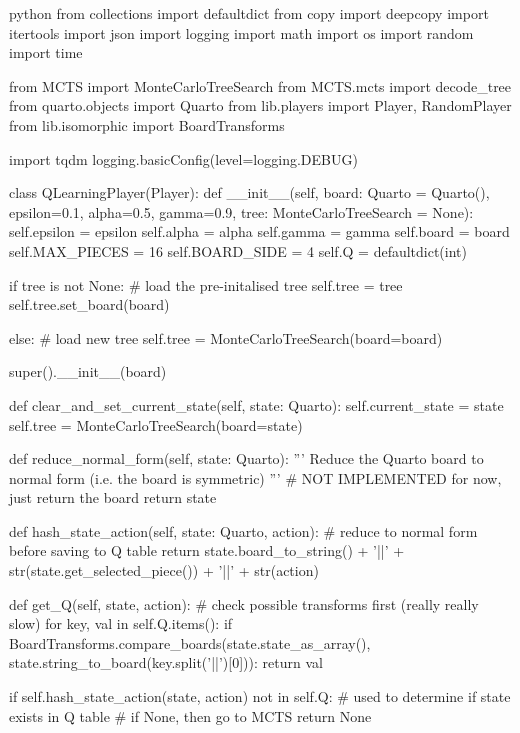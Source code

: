 \begin{mintedbox}{python}
from collections import defaultdict
from copy import deepcopy
import itertools
import json
import logging
import math
import os
import random
import time

from MCTS import MonteCarloTreeSearch
from MCTS.mcts import decode_tree
from quarto.objects import Quarto
from lib.players import Player, RandomPlayer
from lib.isomorphic import BoardTransforms

import tqdm
logging.basicConfig(level=logging.DEBUG)


class QLearningPlayer(Player):
    def __init__(self, board: Quarto = Quarto(), epsilon=0.1, alpha=0.5, gamma=0.9, tree: MonteCarloTreeSearch = None):
        self.epsilon = epsilon
        self.alpha = alpha
        self.gamma = gamma
        self.board = board
        self.MAX_PIECES = 16
        self.BOARD_SIDE = 4
        self.Q = defaultdict(int)

        if tree is not None:
            # load the pre-initalised tree
            self.tree = tree
            self.tree.set_board(board)

        else:
            # load new tree
            self.tree = MonteCarloTreeSearch(board=board)

        super().__init__(board)

    def clear_and_set_current_state(self, state: Quarto):
        self.current_state = state
        self.tree = MonteCarloTreeSearch(board=state)

    def reduce_normal_form(self, state: Quarto):
        '''
        Reduce the Quarto board to normal form (i.e. the board is symmetric)
        '''
        # NOT IMPLEMENTED for now, just return the board
        return state

    def hash_state_action(self, state: Quarto, action):
        # reduce to normal form before saving to Q table
        return state.board_to_string() + '||' + str(state.get_selected_piece()) + '||' + str(action)

    def get_Q(self, state, action):
        # check possible transforms first (really really slow)
        for key, val in self.Q.items():
            if BoardTransforms.compare_boards(state.state_as_array(), state.string_to_board(key.split('||')[0])):
                return val

        if self.hash_state_action(state, action) not in self.Q:
            # used to determine if state exists in Q table
            # if None, then go to MCTS
            return None


\end{mintedbox}
